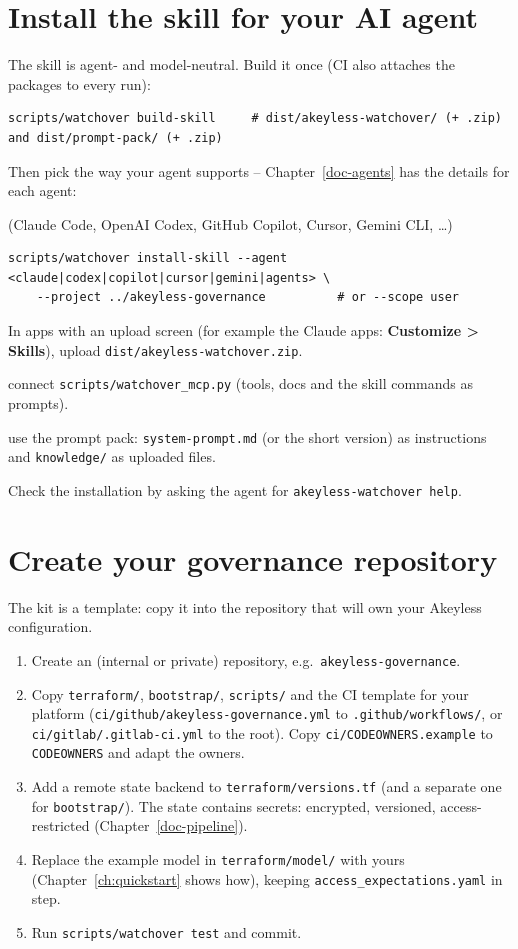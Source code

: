 \section{Install the skill for your AI agent}
The skill is agent- and model-neutral. Build it once (CI also attaches the packages to every run):
\begin{lstlisting}
scripts/watchover build-skill     # dist/akeyless-watchover/ (+ .zip) and dist/prompt-pack/ (+ .zip)
\end{lstlisting}
Then pick the way your agent supports -- Chapter~\ref{doc-agents} has the details for each agent:
\begin{description}[style=nextline,leftmargin=1.5em]
\item[Agents that support Agent Skills] (Claude Code, OpenAI Codex, GitHub Copilot, Cursor, Gemini CLI, \ldots)
\begin{lstlisting}
scripts/watchover install-skill --agent <claude|codex|copilot|cursor|gemini|agents> \
    --project ../akeyless-governance          # or --scope user
\end{lstlisting}
  In apps with an upload screen (for example the Claude apps: \textbf{Customize > Skills}), upload
  \texttt{dist/akeyless-watchover.zip}.
\item[MCP clients] connect \texttt{scripts/watchover\_mcp.py} (tools, docs and the skill commands as prompts).
\item[Chat products and model APIs without either] use the prompt pack: \texttt{system-prompt.md} (or
  the short version) as instructions and \texttt{knowledge/} as uploaded files.
\end{description}
Check the installation by asking the agent for \texttt{akeyless-watchover help}.

\section{Create your governance repository}
The kit is a template: copy it into the repository that will own your Akeyless configuration.
\begin{enumerate}
\item Create an (internal or private) repository, e.g.\ \texttt{akeyless-governance}.
\item Copy \texttt{terraform/}, \texttt{bootstrap/}, \texttt{scripts/} and the CI template for your
  platform (\texttt{ci/github/akeyless-governance.yml} to \texttt{.github/workflows/}, or
  \texttt{ci/gitlab/.gitlab-ci.yml} to the root). Copy \texttt{ci/CODEOWNERS.example} to
  \texttt{CODEOWNERS} and adapt the owners.
\item Add a remote state backend to \texttt{terraform/versions.tf} (and a separate one for
  \texttt{bootstrap/}). The state contains secrets: encrypted, versioned, access-restricted
  (Chapter~\ref{doc-pipeline}).
\item Replace the example model in \texttt{terraform/model/} with yours (Chapter~\ref{ch:quickstart}
  shows how), keeping \texttt{access\_expectations.yaml} in step.
\item Run \texttt{scripts/watchover test} and commit.
\end{enumerate}

